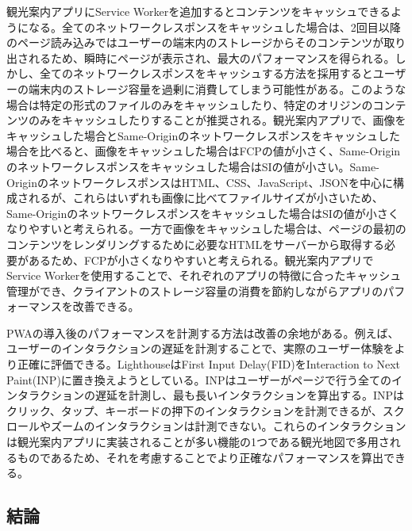 観光案内アプリにService Workerを追加するとコンテンツをキャッシュできるようになる。全てのネットワークレスポンスをキャッシュした場合は、2回目以降のページ読み込みではユーザーの端末内のストレージからそのコンテンツが取り出されるため、瞬時にページが表示され、最大のパフォーマンスを得られる。しかし、全てのネットワークレスポンスをキャッシュする方法を採用するとユーザーの端末内のストレージ容量を過剰に消費してしまう可能性がある。このような場合は特定の形式のファイルのみをキャッシュしたり、特定のオリジンのコンテンツのみをキャッシュしたりすることが推奨される。観光案内アプリで、画像をキャッシュした場合とSame-Originのネットワークレスポンスをキャッシュした場合を比べると、画像をキャッシュした場合はFCPの値が小さく、Same-Originのネットワークレスポンスをキャッシュした場合はSIの値が小さい。Same-OriginのネットワークレスポンスはHTML、CSS、JavaScript、JSONを中心に構成されるが、これらはいずれも画像に比べてファイルサイズが小さいため、Same-Originのネットワークレスポンスをキャッシュした場合はSIの値が小さくなりやすいと考えられる。一方で画像をキャッシュした場合は、ページの最初のコンテンツをレンダリングするために必要なHTMLをサーバーから取得する必要があるため、FCPが小さくなりやすいと考えられる。観光案内アプリでService Workerを使用することで、それぞれのアプリの特徴に合ったキャッシュ管理ができ、クライアントのストレージ容量の消費を節約しながらアプリのパフォーマンスを改善できる。

PWAの導入後のパフォーマンスを計測する方法は改善の余地がある。例えば、ユーザーのインタラクションの遅延を計測することで、実際のユーザー体験をより正確に評価できる。LighthouseはFirst Input Delay(FID)をInteraction to Next Paint(INP)に置き換えようとしている。INPはユーザーがページで行う全てのインタラクションの遅延を計測し、最も長いインタラクションを算出する。INPはクリック、タップ、キーボードの押下のインタラクションを計測できるが、スクロールやズームのインタラクションは計測できない。これらのインタラクションは観光案内アプリに実装されることが多い機能の1つである観光地図で多用されるものであるため、それを考慮することでより正確なパフォーマンスを算出できる。

\subsection{結論}
\label{subsection:結論}
